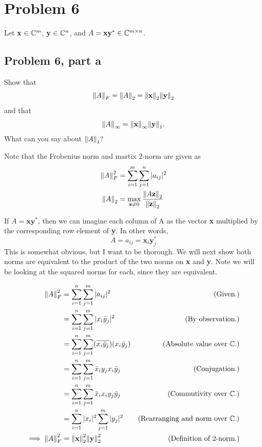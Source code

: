 \newpage
\section{Problem 6}
Let \textbf{x} $\in \mathbb{C}^m$, \textbf{y} $\in \mathbb{C}^n$, and $A = \textbf{x}\textbf{y}^* \in \mathbb{C}^{m\times n}$.

\subsection{Problem 6, part a}
Show that
\[
\norm{A}_F = \norm{A}_2 = \norm{\textbf{x}}_2\norm{\textbf{y}}_2
\]
and that 
\[
\norm{A}_\infty = \norm{\textbf{x}}_\infty \norm{\textbf{y}}_1.
\]
What can you say about $\norm{A}_1?$
\partbreak
\begin{solution}

    Note that the Frobenius norm and martix $2$-norm are given as
    \alignbreak
    \begin{align}
    \norm{A}_F^2 &= \sum_{i = 1}^m\sum_{j = 1}^n|a_{ij}|^2\nonumber\\
    \norm{A}_2 &= \max_{\textbf{z} \neq 0}\frac{\norm{A\textbf{z}}_2}{\norm{\textbf{z}}_2}\nonumber
    \end{align}
    \alignbreak

    If $A = \textbf{x}\textbf{y}^*$, then we can imagine each column of A as the vector \textbf{x} multiplied by the corresponding row element of \textbf{y}. In other words,
    \[
    A = a_{ij} = \textbf{x}_i\textbf{y}_j^*
    \]
    This is somewhat obvious, but I want to be thorough. We will next show both norms are equivalent to the product of the two norms on \textbf{x} and \textbf{y}. Note we will be looking at the squared norms for each, since they are equivalent.
    
    \alignbreak
    \begin{align}
        \norm{A}_F^2 &= \sum_{i = 1}^{n}\sum_{j = 1}^m |a_{ij}|^2 &\text{(Given.)}\nonumber\\
        &= \sum_{i = 1}^{n}\sum_{j = 1}^m |x_i\Bar{y}_j|^2 &\text{(By observation.)}\nonumber\\
        &= \sum_{i = 1}^{n}\sum_{j = 1}^m (\overline{x_i\Bar{y}_j})(x_i\Bar{y}_j) &\text{(Absolute value over $\mathbb{C}$.)}\nonumber\\
        &= \sum_{i = 1}^{n}\sum_{j = 1}^m \Bar{x}_iy_jx_i\Bar{y}_j &\text{(Conjugation.)}\nonumber\\
        &= \sum_{i = 1}^{n}\sum_{j = 1}^m \Bar{x}_ix_i y_j\Bar{y}_j &\text{(Commutivity over $\mathbb{C}$.)}\nonumber\\
        &= \sum_{i = 1}^{n}|x_i|^2\sum_{j = 1}^m|y_j|^2 &\text{(Rearranging and norm over $\mathbb{C}$.)}\nonumber\\
     \implies   \norm{A}_F^2&= \norm{\textbf{x}}_2^2\norm{\textbf{y}}_2^2 &\text{(Definition of $2$-norm.)}\nonumber
    \end{align}
    \alignbreak


\end{solution}
